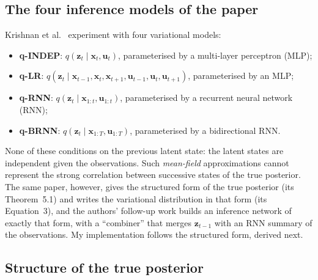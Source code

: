 \subsection{The four inference models of the paper}

Krishnan et al.\ \cite{krishnan2015deep} experiment with four
variational models:
\begin{itemize}
    \item \textbf{q-INDEP}: $q(\mathbf{z}_t \mid \mathbf{x}_t,
    \mathbf{u}_t)$, parameterised by a multi-layer perceptron (MLP);
    \item \textbf{q-LR}: $q(\mathbf{z}_t \mid \mathbf{x}_{t-1},
    \mathbf{x}_t, \mathbf{x}_{t+1}, \mathbf{u}_{t-1}, \mathbf{u}_t,
    \mathbf{u}_{t+1})$, parameterised by an MLP;
    \item \textbf{q-RNN}: $q(\mathbf{z}_t \mid \mathbf{x}_{1:t},
    \mathbf{u}_{1:t})$, parameterised by a recurrent neural network (RNN);
    \item \textbf{q-BRNN}: $q(\mathbf{z}_t \mid \mathbf{x}_{1:T},
    \mathbf{u}_{1:T})$, parameterised by a bidirectional RNN.
\end{itemize}
None of these conditions on the previous latent state: the latent
states are independent given the observations. Such \emph{mean-field}
approximations cannot represent the strong correlation between
successive states of the true posterior. The same paper, however, gives
the structured form of the true posterior (its Theorem~5.1) and writes
the variational distribution in that form (its Equation~3), and the
authors' follow-up work \cite{krishnan2017structured} builds an inference network
of exactly that form, with a \enquote{combiner} that merges
$\mathbf{z}_{t-1}$ with an RNN summary of the observations. My
implementation follows the structured form, derived next.

\subsection{Structure of the true posterior}

